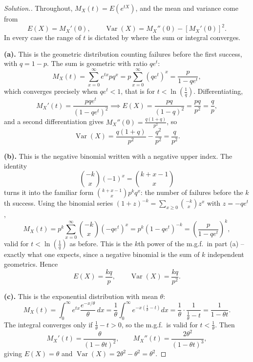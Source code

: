 \documentclass[12pt,a4paper]{report}
\theoremstyle{definition}
\theoremstyle{plain}
\theoremstyle{definition}
\newenvironment{solution}
  {\renewcommand{\qedsymbol}{}\begin{proof}[\textit{Solution}.]}
  {\end{proof}}
\begin{document}
\begin{solution}
Throughout, $M_X(t) = E(e^{tX})$, and the mean and variance come from
\[E(X) = M_X'(0), \qquad \operatorname{Var}(X) = M_X''(0)-\left[M_X'(0)\right]^{2}.\]
In every case the range of $t$ is dictated by where the sum or integral converges.

\textbf{(a).} This is the geometric distribution counting failures before the first
success, with $q = 1-p$. The sum is geometric with ratio $qe^{t}$:
\[M_X(t) = \sum_{x=0}^{\infty}e^{tx}pq^{x} = p\sum_{x=0}^{\infty}\left(qe^{t}\right)^{x}
 = \frac{p}{1-qe^{t}},\]
which converges precisely when $qe^{t}<1$, that is for
$t < \ln\left(\tfrac{1}{q}\right)$. Differentiating,
\[M_X'(t) = \frac{pqe^{t}}{\left(1-qe^{t}\right)^{2}}
 \implies E(X) = \frac{pq}{(1-q)^{2}} = \frac{pq}{p^{2}} = \frac{q}{p},\]
and a second differentiation gives $M_X''(0) = \frac{q(1+q)}{p^{2}}$, so
\[\operatorname{Var}(X) = \frac{q(1+q)}{p^{2}}-\frac{q^{2}}{p^{2}} = \frac{q}{p^{2}}.\]

\textbf{(b).} This is the negative binomial written with a negative upper index. The
identity
\[\binom{-k}{x}(-1)^{x} = \binom{k+x-1}{x}\]
turns it into the familiar form $\binom{k+x-1}{x}p^{k}q^{x}$: the number of failures
before the $k$th success. Using the binomial series
$(1+z)^{-k} = \sum_{x\geq 0}\binom{-k}{x}z^{x}$ with $z = -qe^{t}$,
\[M_X(t) = p^{k}\sum_{x=0}^{\infty}\binom{-k}{x}\left(-qe^{t}\right)^{x}
 = p^{k}\left(1-qe^{t}\right)^{-k} = \left(\frac{p}{1-qe^{t}}\right)^{\!k},\]
valid for $t<\ln\left(\tfrac1q\right)$ as before. This is the $k$th power of the m.g.f.\
in part (a) -- exactly what one expects, since a negative binomial is the sum of $k$
independent geometrics. Hence
\[E(X) = \frac{kq}{p}, \qquad \operatorname{Var}(X) = \frac{kq}{p^{2}}.\]

\textbf{(c).} This is the exponential distribution with mean $\theta$:
\[M_X(t) = \int_0^{\infty}e^{tx}\frac{e^{-x/\theta}}{\theta}\,dx
 = \frac{1}{\theta}\int_0^{\infty}e^{-x\left(\frac{1}{\theta}-t\right)}dx
 = \frac{1}{\theta}\cdot\frac{1}{\frac{1}{\theta}-t} = \frac{1}{1-\theta t}.\]
The integral converges only if $\tfrac{1}{\theta}-t>0$, so the m.g.f.\ is valid for
$t<\tfrac{1}{\theta}$. Then
\[M_X'(t) = \frac{\theta}{(1-\theta t)^{2}},\qquad
M_X''(t) = \frac{2\theta^{2}}{(1-\theta t)^{3}},\]
giving $E(X) = \theta$ and
$\operatorname{Var}(X) = 2\theta^{2}-\theta^{2} = \theta^{2}$.


\end{solution}
\end{document}
